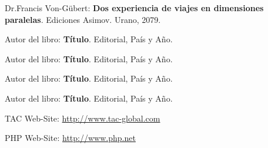 \documentclass[11pt,letterpaper]{article}
\begin{document}



\begin{thebibliography}{99}

 Dr.Francis Von-Gübert: \textbf{Dos experiencia de viajes en dimensiones paralelas}. Ediciones Asimov. Urano, 2079.

 Autor del libro: \textbf{Título}. Editorial, País y Año.

 Autor del libro: \textbf{Título}. Editorial, País y Año.

 Autor del libro: \textbf{Título}. Editorial, País y Año.

 Autor del libro: \textbf{Título}. Editorial, País y Año.

 TAC Web-Site: \url{http://www.tac-global.com}

 PHP Web-Site: \url{http://www.php.net}

\end{thebibliography}


\end{document}
